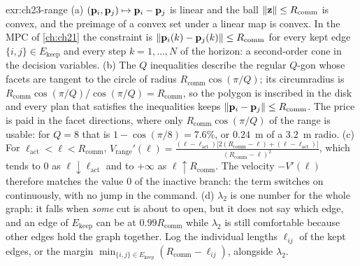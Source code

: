 \begin{solution}{exr:ch23-range}
(a) $(\mathbf{p}_i,\mathbf{p}_j)\mapsto\mathbf{p}_i-\mathbf{p}_j$ is linear and the ball $\left\lVert \mathbf{z} \right\rVert\le R_{\mathrm{comm}}$ is convex, and the preimage of a convex set under a linear map is convex. In the MPC of \cref{ch:ch21} the constraint is $\left\lVert \mathbf{p}_i(k)-\mathbf{p}_j(k) \right\rVert\le R_{\mathrm{comm}}$ for every kept edge $\{i,j\}\in E_{\mathrm{keep}}$ and every step $k=1,\dots,N$ of the horizon: a second-order cone in the decision variables. (b) The $Q$ inequalities describe the regular $Q$-gon whose facets are tangent to the circle of radius $R_{\mathrm{comm}}\cos(\pi/Q)$; its circumradius is $R_{\mathrm{comm}}\cos(\pi/Q)/\cos(\pi/Q)=R_{\mathrm{comm}}$, so the polygon is inscribed in the disk and every plan that satisfies the inequalities keeps $\left\lVert \mathbf{p}_i-\mathbf{p}_j \right\rVert\le R_{\mathrm{comm}}$. The price is paid in the facet directions, where only $R_{\mathrm{comm}}\cos(\pi/Q)$ of the range is usable: for $Q=8$ that is $1-\cos(\pi/8)=7.6\%$, or $0.24$~m of a $3.2$~m radio. (c) For $\ell_{\mathrm{act}}<\ell<R_{\mathrm{comm}}$, $V_{\mathrm{range}}'(\ell)=\frac{(\ell-\ell_{\mathrm{act}})\bigl[2(R_{\mathrm{comm}}-\ell)+(\ell-\ell_{\mathrm{act}})\bigr]}{(R_{\mathrm{comm}}-\ell)^2}$, which tends to $0$ as $\ell\downarrow\ell_{\mathrm{act}}$ and to $+\infty$ as $\ell\uparrow R_{\mathrm{comm}}$. The velocity $-V'(\ell)$ therefore matches the value $0$ of the inactive branch: the term switches on continuously, with no jump in the command. (d) $\lambda_2$ is one number for the whole graph: it falls when \emph{some} cut is about to open, but it does not say which edge, and an edge of $E_{\mathrm{keep}}$ can be at $0.99R_{\mathrm{comm}}$ while $\lambda_2$ is still comfortable because other edges hold the graph together. Log the individual lengths $\ell_{ij}$ of the kept edges, or the margin $\min_{\{i,j\}\in E_{\mathrm{keep}}}(R_{\mathrm{comm}}-\ell_{ij})$, alongside $\lambda_2$.
\end{solution}

